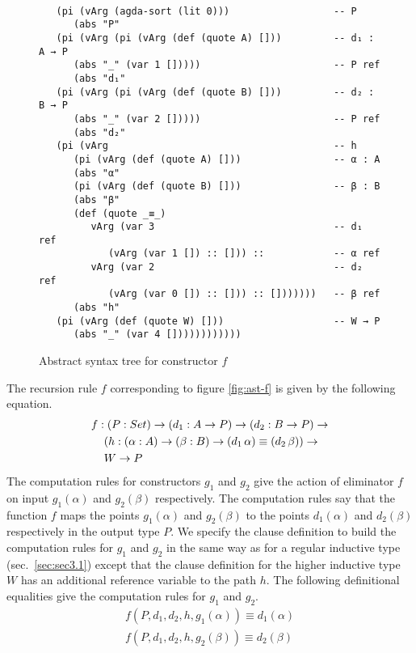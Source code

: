 \documentclass[sigplan,10pt]{acmart}
\begin{document}
\begin{figure}
\begin{center}
\begingroup
\fontsize{7pt}{9pt}\selectfont
\begin{Verbatim}[frame = single]

   (pi (vArg (agda-sort (lit 0)))                  -- P
      (abs "P"
   (pi (vArg (pi (vArg (def (quote A) []))         -- d₁ : A → P
      (abs "_" (var 1 []))))                       -- P ref
      (abs "d₁"
   (pi (vArg (pi (vArg (def (quote B) []))         -- d₂ : B → P
      (abs "_" (var 2 []))))                       -- P ref
      (abs "d₂"
   (pi (vArg                                       -- h
      (pi (vArg (def (quote A) []))                -- α : A
      (abs "α"
      (pi (vArg (def (quote B) []))                -- β : B
      (abs "β"
      (def (quote _≡_)
         vArg (var 3                               -- d₁ ref
            (vArg (var 1 []) :: [])) ::            -- α ref
         vArg (var 2                               -- d₂ ref
            (vArg (var 0 []) :: [])) :: []))))))   -- β ref
      (abs "h" 
   (pi (vArg (def (quote W) []))                   -- W → P
      (abs "_" (var 4 [])))))))))))

\end{Verbatim}
\endgroup
\end{center}
\caption{Abstract syntax tree for constructor $f$}
\label{fig:ast-f}
\end{figure}

The recursion rule $f$ corresponding to figure \eqref{fig:ast-f} is given by the following equation.
\begin{align}
& f : (P : Set) \rightarrow (d_1 : A \rightarrow P) \rightarrow (d_2 : B \rightarrow P) \rightarrow \nonumber \\
& \hspace {0.4cm} (h : (\alpha : A) \rightarrow (\beta : B) \rightarrow (d_1 \, \alpha) \equiv (d_2 \, \beta)) \rightarrow \nonumber \\
& \hspace {0.4cm} W \rightarrow P \nonumber
\end{align}
The computation rules for constructors $g_1$ and $g_2$ give the action of eliminator $f$ on input $g_1 (\alpha)$ and $g_2 (\beta)$ respectively. The computation rules say that the function $f$ maps the points $g_1 (\alpha)$ and $g_2 (\beta)$ to the points $d_1 (\alpha)$ and $d_2 (\beta)$ respectively in the output type $P$. We specify the clause definition to build the computation rules for $g_1$ and $g_2$ in the same way as for a regular inductive type (sec.~\ref{sec:sec3.1}) except that the clause definition for the higher inductive type $W$ has an additional reference variable to the path $h$. The following definitional equalities give the computation rules for $g_1$ and $g_2$.
\begin{align}
f (P, d_1, d_2, h, g_1 (\alpha)) \equiv d_1 (\alpha) \nonumber \\
f (P, d_1, d_2, h, g_2 (\beta)) \equiv d_2 (\beta) \nonumber
\end{align}
\end{document}
